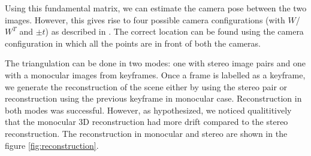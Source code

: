 \documentclass{article}
\begin{document}
Using this fundamental matrix, we can estimate the camera pose between the two images. However, this gives rise to four possible camera configurations (with $W$/$W^T$ and $\pm t$) as described in \cite{Hartley2004}. The correct location can be found using the camera configuration in which all the points are in front of both the cameras.

The triangulation can be done in two modes: one with stereo image pairs and one with a monocular images from keyframes. Once a frame is labelled as a keyframe, we generate the reconstruction of the scene either by using the stereo pair or reconstruction using the previous keyframe in monocular case. Reconstruction in both modes was successful. However, as hypothesized, we noticed qualititively that the monocular 3D reconstruction had more drift compared to the stereo reconstruction. The reconstruction in monocular and stereo are shown in the figure \ref{fig:reconstruction}.
\end{document}
